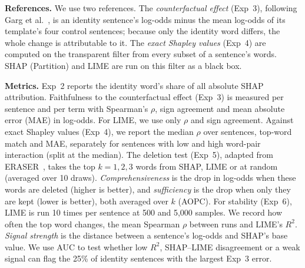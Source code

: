 \smallskip
\noindent\textbf{References.}
We use two references.
The \emph{counterfactual effect} (Exp~3), following Garg et al.~\cite{garg2019counterfactual},
is an identity sentence's log-odds minus the mean log-odds of its template's four control sentences;
because only the identity word differs, the whole change is attributable to it.
The \emph{exact Shapley values} (Exp~4) are computed on the transparent filter
from every subset of a sentence's words.
SHAP (Partition) and LIME are run on this filter as a black box.

\smallskip
\noindent\textbf{Metrics.}
Exp~2 reports the identity word's share of all absolute SHAP attribution.
Faithfulness to the counterfactual effect (Exp~3) is measured per sentence and per term
with Spearman's $\rho$, sign agreement and mean absolute error (MAE) in log-odds.
For LIME, we use only $\rho$ and sign agreement.
Against exact Shapley values (Exp~4), we report the median $\rho$ over sentences, top-word match and MAE,
separately for sentences with low and high word-pair interaction (split at the median).
The deletion test (Exp~5), adapted from ERASER~\cite{deyoung2020eraser},
takes the top $k = 1, 2, 3$ words from SHAP, LIME or at random (averaged over 10 draws).
\emph{Comprehensiveness} is the drop in log-odds when these words are deleted (higher is better), and \emph{sufficiency} is the drop when only they are kept (lower is better), both averaged over $k$ (AOPC).
For stability (Exp~6), LIME is run 10 times per sentence at 500 and 5,000 samples.
We record how often the top word changes, the mean Spearman $\rho$ between runs and LIME's $R^2$.
\emph{Signal strength} is the distance between a sentence's log-odds and SHAP's base value.
We use AUC to test whether low $R^2$, SHAP--LIME disagreement or a weak signal
can flag the 25\% of identity sentences with the largest Exp~3 error.

